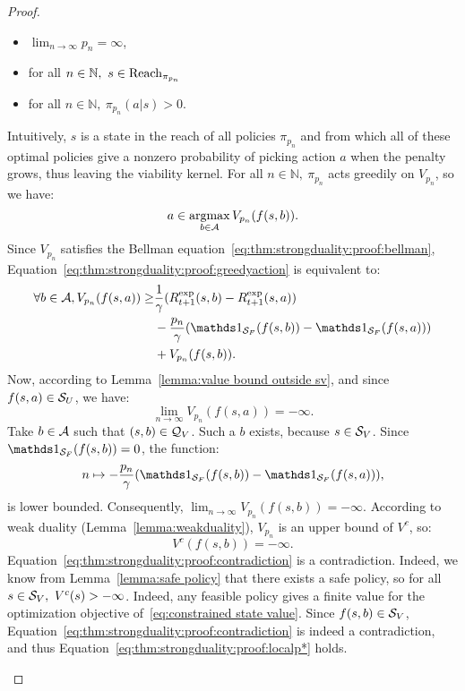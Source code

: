 \begin{proof}
\begin{subproof}
		\begin{itemize}
			\item $\lim_{n\to\infty}p_n = \infty$,
			\item for all $n\in\mathbb{N},~s\in\operatorname{Reach}_{\pi_{p_n}}$
			\item for all $n\in\mathbb{N},~\pi_{p_n}(a|s) > 0$.
		\end{itemize}
		Intuitively, $s$ is a state in the reach of all policies $\pi_{p_n}$ and from which all of these optimal policies  give a nonzero probability of picking action $a$ when the penalty grows, thus leaving the viability kernel. For all $n\in\mathbb{N},~\pi_{p_n}$ acts greedily on $V_{p_n}$, so we have:
		\begin{equation}
		a\in\operatorname*{argmax}_{b\in\mathcal{A}}V_{p_n}(f(s, b)).
		\label{eq:thm:strongduality:proof:greedyaction}
		\end{equation}
		Since $V_{p_n}$ satisfies the Bellman equation~\eqref{eq:thm:strongduality:proof:bellman}, Equation~\eqref{eq:thm:strongduality:proof:greedyaction} is equivalent to:
		\begin{equation}
		\begin{split}
		\forall b\in\A, V_{p_n}(f(s,a))\geq
		&\frac{1}{\gamma}(\Rexp_{t+1}(s,b) - \Rexp_{t+1}(s,a)) \\
		&-\frac{{p_n}}{\gamma}(\indicator_\SF(f(s,b))-\indicator_\SF(f(s,a))) \\
		&+ V_{p_n}(f(s,b)).
		\end{split}
		\label{eq:thm:strongduality:proof:vplowerbound}
		\end{equation}
		Now, according to Lemma~\ref{lemma:value bound outside sv}, and since $f(s,a)\in{\ensuremath{\mathcal{S}}_{U}}$, we have: $$\lim_{n\to\infty}V_{p_n}(f(s,a)) = -\infty.$$
		Take $b\in\mathcal{A}$ such that $(s,b)\in\mathcal{Q}_{V}$. Such a $b$ exists, because $s\in{\ensuremath{\mathcal{S}}_{V}}$. Since $\indicator_\SF(f(s,b)) = 0$, the function:
		$$
		n\mapsto-\frac{p_n}{\gamma}(\indicator_\SF(f(s,b)) - \indicator_\SF(f(s,a))),
		$$
		is lower bounded. Consequently, $\lim_{n\to\infty}V_{p_n}(f(s,b)) = - \infty$. According to weak duality (Lemma~\ref{lemma:weakduality}), $V_{p_n}$ is an upper bound of $V^c$, so:
		\begin{equation}
		V^c(f(s, b)) = - \infty.
		\label{eq:thm:strongduality:proof:contradiction}
		\end{equation}
		Equation~\eqref{eq:thm:strongduality:proof:contradiction} is a contradiction. Indeed, we know from Lemma~\ref{lemma:safe policy} that there exists a safe policy, so for all $s\in{\ensuremath{\mathcal{S}}_{V}},~V^c(s) > -\infty$. Indeed, any feasible policy gives a finite value for the optimization objective of~\eqref{eq:constrained state value}. Since $f(s,b)\in{\ensuremath{\mathcal{S}}_{V}}$, Equation~\eqref{eq:thm:strongduality:proof:contradiction} is indeed a contradiction, and thus Equation~\eqref{eq:thm:strongduality:proof:localp*} holds.

\end{subproof}
\end{proof}
